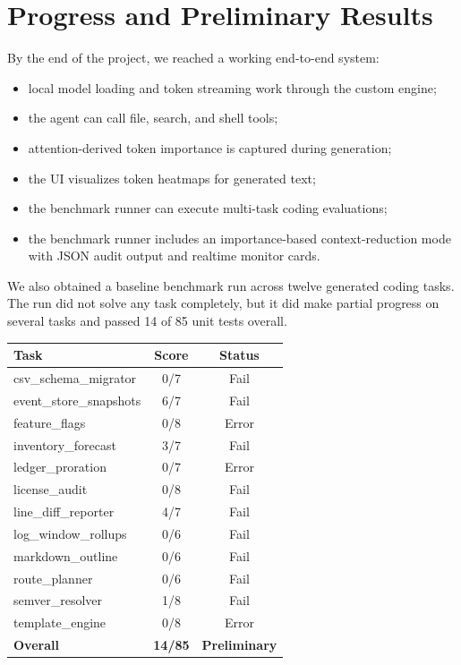 \documentclass[11pt]{article}
\begin{document}
\section*{Progress and Preliminary Results}

By the end of the project, we reached a working end-to-end system:

\begin{itemize}
    \item local model loading and token streaming work through the custom engine;
    \item the agent can call file, search, and shell tools;
    \item attention-derived token importance is captured during generation;
    \item the UI visualizes token heatmaps for generated text;
    \item the benchmark runner can execute multi-task coding evaluations;
    \item the benchmark runner includes an importance-based context-reduction
    mode with JSON audit output and realtime monitor cards.
\end{itemize}

We also obtained a baseline benchmark run across twelve generated coding tasks.
The run did not solve any task completely, but it did make partial progress on
several tasks and passed 14 of 85 unit tests overall.

\begin{center}
\begin{tabular}{|>{\raggedright\arraybackslash}p{}|c|c|}
\hline
\textbf{Task} & \textbf{Score} & \textbf{Status} \\
\hline
csv\_schema\_migrator & 0/7 & Fail \\
event\_store\_snapshots & 6/7 & Fail \\
feature\_flags & 0/8 & Error \\
inventory\_forecast & 3/7 & Fail \\
ledger\_proration & 0/7 & Error \\
license\_audit & 0/8 & Fail \\
line\_diff\_reporter & 4/7 & Fail \\
log\_window\_rollups & 0/6 & Fail \\
markdown\_outline & 0/6 & Fail \\
route\_planner & 0/6 & Fail \\
semver\_resolver & 1/8 & Fail \\
template\_engine & 0/8 & Error \\
\hline
\textbf{Overall} & \textbf{14/85} & \textbf{Preliminary} \\
\hline
\end{tabular}
\end{center}
\end{document}
